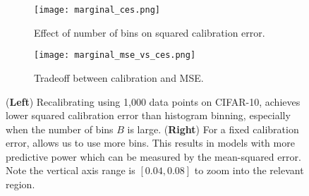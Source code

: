 \begin{figure}
  \centering
  \centering
     \begin{subfigure}[b]{0.54\textwidth}
         \centering
         \texttt{[image: marginal\_ces.png]}
         \caption{Effect of number of bins on squared calibration error. }
         \label{fig:marginal_calibrator_comparison_cifar}
     \end{subfigure}
     \hfill
     \begin{subfigure}[b]{0.44\textwidth}
         \centering
         \texttt{[image: marginal\_mse\_vs\_ces.png]}
         \caption{Tradeoff between calibration and MSE. }
         \label{fig:cifar_calibrator_cmp_mse_ce}
     \end{subfigure}
  \caption{
  (\textbf{Left}) Recalibrating using 1,000 data points on CIFAR-10, \ourcal{} achieves lower squared calibration error than histogram binning, especially when the number of bins $B$ is large.
  (\textbf{Right}) For a fixed calibration error, \ourcal{} allows us to use more bins. This results in models with more predictive power which can be measured by the mean-squared error. Note the vertical axis range is $[0.04, 0.08]$ to zoom into the relevant region.
  }
  \label{fig:nan2}
\end{figure}

